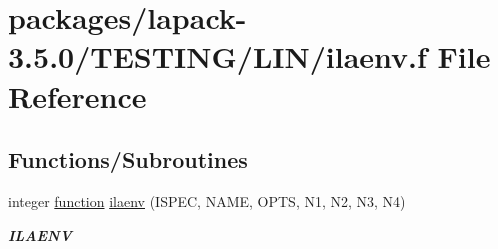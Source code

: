 \hypertarget{TESTING_2LIN_2ilaenv_8f}{}\section{packages/lapack-\/3.5.0/\+T\+E\+S\+T\+I\+N\+G/\+L\+I\+N/ilaenv.f File Reference}
\label{TESTING_2LIN_2ilaenv_8f}
\subsection*{Functions/\+Subroutines}
\begin{DoxyCompactItemize}
\item 
integer \hyperlink{afunc_8m_a7b5e596df91eadea6c537c0825e894a7}{function} \hyperlink{group__aux__lin_gab1f37bde76d31aee91a09bb2f8e87ce6}{ilaenv} (I\+S\+P\+E\+C, N\+A\+M\+E, O\+P\+T\+S, N1, N2, N3, N4)
\begin{DoxyCompactList}\small\item\em {\bfseries I\+L\+A\+E\+N\+V} \end{DoxyCompactList}\end{DoxyCompactItemize}
